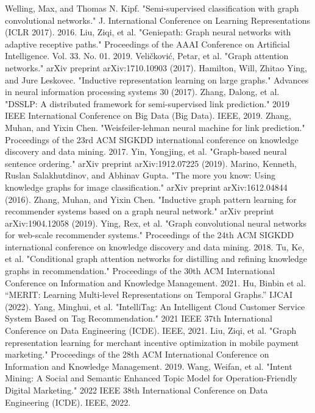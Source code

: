 \documentclass[conference]{IEEEtran}
\begin{document}
\begin{thebibliography}{00}
 Welling, Max, and Thomas N. Kipf. "Semi-supervised classification with graph convolutional networks." J. International Conference on Learning Representations (ICLR 2017). 2016.
 Liu, Ziqi, et al. "Geniepath: Graph neural networks with adaptive receptive paths." Proceedings of the AAAI Conference on Artificial Intelligence. Vol. 33. No. 01. 2019.
 Veličković, Petar, et al. "Graph attention networks." arXiv preprint arXiv:1710.10903 (2017).
 Hamilton, Will, Zhitao Ying, and Jure Leskovec. "Inductive representation learning on large graphs." Advances in neural information processing systems 30 (2017).
 Zhang, Dalong, et al. "DSSLP: A distributed framework for semi-supervised link prediction." 2019 IEEE International Conference on Big Data (Big Data). IEEE, 2019.
 Zhang, Muhan, and Yixin Chen. "Weisfeiler-lehman neural machine for link prediction." Proceedings of the 23rd ACM SIGKDD international conference on knowledge discovery and data mining. 2017.
 Yin, Yongjing, et al. "Graph-based neural sentence ordering." arXiv preprint arXiv:1912.07225 (2019).
 Marino, Kenneth, Ruslan Salakhutdinov, and Abhinav Gupta. "The more you know: Using knowledge graphs for image classification." arXiv preprint arXiv:1612.04844 (2016).
 Zhang, Muhan, and Yixin Chen. "Inductive graph pattern learning for recommender systems based on a graph neural network." arXiv preprint arXiv:1904.12058 (2019).
 Ying, Rex, et al. "Graph convolutional neural networks for web-scale recommender systems." Proceedings of the 24th ACM SIGKDD international conference on knowledge discovery and data mining. 2018.
 Tu, Ke, et al. "Conditional graph attention networks for distilling and refining knowledge graphs in recommendation." Proceedings of the 30th ACM International Conference on Information and Knowledge Management. 2021.
 Hu, Binbin et al. “MERIT: Learning Multi-level Representations on Temporal Graphs.” IJCAI (2022).
 Yang, Minghui, et al. "IntelliTag: An Intelligent Cloud Customer Service System Based on Tag Recommendation." 2021 IEEE 37th International Conference on Data Engineering (ICDE). IEEE, 2021.
 Liu, Ziqi, et al. "Graph representation learning for merchant incentive optimization in mobile payment marketing." Proceedings of the 28th ACM International Conference on Information and Knowledge Management. 2019.
  Wang, Weifan, et al. "Intent Mining: A Social and Semantic Enhanced Topic Model for Operation-Friendly Digital Marketing." 2022 IEEE 38th International Conference on Data Engineering (ICDE). IEEE, 2022.

\end{thebibliography}
\end{document}
